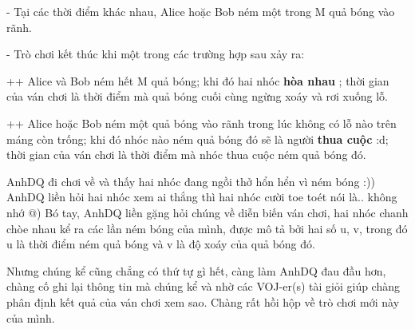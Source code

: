    - Tại các thời điểm khác nhau, Alice hoặc Bob ném một trong M quả bóng vào rãnh.   


   - Trò chơi kết thúc khi một trong các trường hợp sau xảy ra:   


   ++ Alice và Bob ném hết M quả bóng; khi đó hai nhóc   \textbf{    hòa nhau   }   ; thời gian của ván chơi là thời điểm mà quả bóng cuối cùng ngừng xoáy và rơi xuống lỗ.   


   ++ Alice hoặc Bob ném một quả bóng vào rãnh trong lúc không có lỗ nào trên máng còn trống; khi đó nhóc nào ném quả bóng đó sẽ là người   \textbf{    thua cuộc   }   :d; thời gian của ván chơi là thời điểm mà nhóc thua cuộc ném quả bóng đó.  

   AnhDQ đi chơi về và thấy hai nhóc đang ngồi thở hổn hển vì ném bóng :)) AnhDQ liền hỏi hai nhóc xem ai thắng thì hai nhóc cười toe toét nói là.. không nhớ @) Bó tay, AnhDQ liền gặng hỏi chúng về diễn biến ván chơi, hai nhóc chanh chòe nhau kể ra các lần ném bóng của mình, được mô tả bởi hai số u, v, trong đó u là thời điểm ném quả bóng và v là độ xoáy của quả bóng đó.  

   Nhưng chúng kể cũng chẳng có thứ tự gì hết, càng làm AnhDQ đau đầu hơn, chàng cố ghi lại thông tin mà chúng kể và nhờ các VOJ-er(s) tài giỏi giúp chàng phân định kết quả của ván chơi xem sao. Chàng rất hồi hộp về trò chơi mới này của mình.